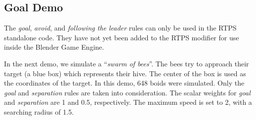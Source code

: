 \subsection{Goal Demo}
The \textit{goal}, \textit{avoid}, and \textit{following the leader} rules can only be used in the RTPS standalone code. They have not yet been added to the RTPS modifier for use inside the Blender Game Engine. 

In the next demo, we simulate a ``\textit{swarm of bees}''. The bees try to approach their target (a blue box) which represents their hive. The center of the box is used as the coordinates of the target. In this demo, 648 boids were simulated. Only the \textit{goal} and \textit{separation} rules are taken into consideration. The scalar weights for \textit{goal} and \textit{separation} are 1 and 0.5, respectively. The maximum speed is set to 2, with a searching radius of 1.5. 

